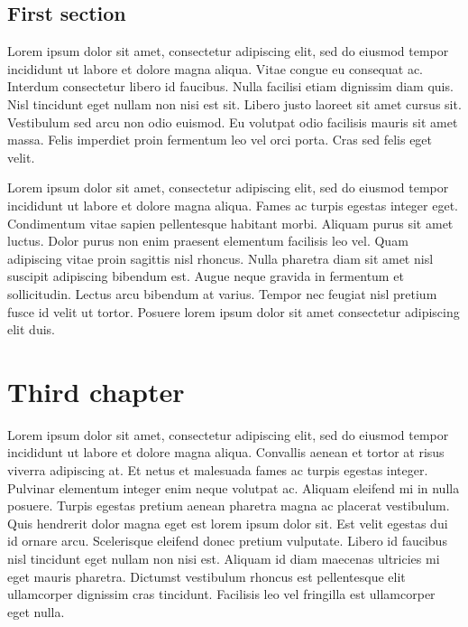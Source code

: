 \documentclass[epsf,a4paper]{book}
\begin{document}
\section{First section}

Lorem ipsum dolor sit amet, consectetur adipiscing elit, sed do eiusmod tempor incididunt ut labore et dolore magna aliqua. Vitae congue eu consequat ac. Interdum consectetur libero id faucibus. Nulla facilisi etiam dignissim diam quis. Nisl tincidunt eget nullam non nisi est sit. Libero justo laoreet sit amet cursus sit. Vestibulum sed arcu non odio euismod. Eu volutpat odio facilisis mauris sit amet massa. Felis imperdiet proin fermentum leo vel orci porta. Cras sed felis eget velit.



Lorem ipsum dolor sit amet, consectetur adipiscing elit, sed do eiusmod tempor incididunt ut labore et dolore magna aliqua. Fames ac turpis egestas integer eget. Condimentum vitae sapien pellentesque habitant morbi. Aliquam purus sit amet luctus. Dolor purus non enim praesent elementum facilisis leo vel. Quam adipiscing vitae proin sagittis nisl rhoncus. Nulla pharetra diam sit amet nisl suscipit adipiscing bibendum est. Augue neque gravida in fermentum et sollicitudin. Lectus arcu bibendum at varius. Tempor nec feugiat nisl pretium fusce id velit ut tortor. Posuere lorem ipsum dolor sit amet consectetur adipiscing elit duis.

\chapter{Third chapter}

Lorem ipsum dolor sit amet, consectetur adipiscing elit, sed do eiusmod tempor incididunt ut labore et dolore magna aliqua. Convallis aenean et tortor at risus viverra adipiscing at. Et netus et malesuada fames ac turpis egestas integer. Pulvinar elementum integer enim neque volutpat ac. Aliquam eleifend mi in nulla posuere. Turpis egestas pretium aenean pharetra magna ac placerat vestibulum. Quis hendrerit dolor magna eget est lorem ipsum dolor sit. Est velit egestas dui id ornare arcu. Scelerisque eleifend donec pretium vulputate. Libero id faucibus nisl tincidunt eget nullam non nisi est. Aliquam id diam maecenas ultricies mi eget mauris pharetra. Dictumst vestibulum rhoncus est pellentesque elit ullamcorper dignissim cras tincidunt. Facilisis leo vel fringilla est ullamcorper eget nulla.
\end{document}
